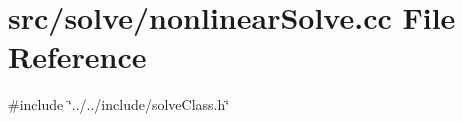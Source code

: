 \section{src/solve/nonlinear\+Solve.cc File Reference}
\label{nonlinear_solve_8cc}
{\ttfamily \#include \char`\"{}../../include/solve\+Class.\+h\char`\"{}}\newline
